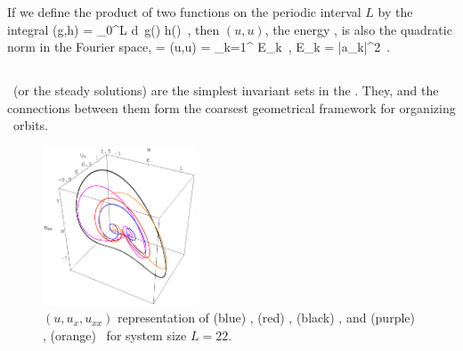 If we define the product of two functions on the
periodic interval $L$ by the integral
\beq
        (g,h) = \int_0^{L} d\pSpace\, 
		g(\pSpace) h(\pSpace)
        \,,
        \label{rpo:innerProd}
\eeq
then $(u,u)$, the energy ,
is also the quadratic norm in the Fourier space,
\beq
\expctE = (u,u) = \sum_{k=1}^{\infty} E_k
\,,\qquad 
E_k = %
	|a_k|^2
\,.


\subsection{\Eqva} %
\label{sec:stks}


\Eqva\  (or the steady solutions)
are the simplest invariant sets in
the \statesp. They,  and 
the connections between them form the
coarsest geometrical framework for organizing
\statesp\ orbits. %

\begin{figure}[t] \label{f:eqvSpatial}
\begin{center} 
\includegraphics[width=0.4\textwidth]{figs/equilSpatial.eps}
\end{center}
\caption{
$(u,u_x,u_{xx})$ representation
of (blue) , (red) ,  (black)  \eqva,
 and (purple) , (orange)  \reqva\ for
system size $L=22$. %
        }
\end{figure}

